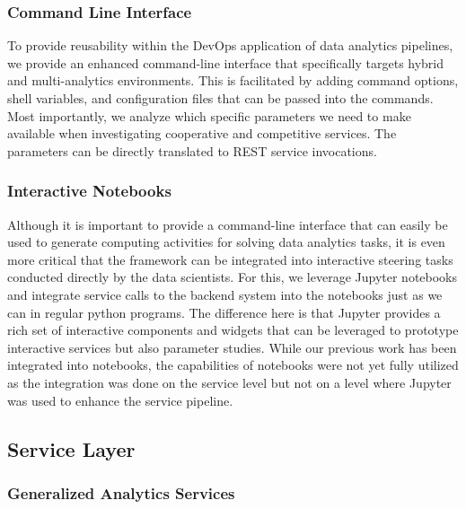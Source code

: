 \subsubsection{Command Line Interface}

To provide reusability within the DevOps application of data analytics
pipelines, we provide an enhanced command-line interface that
specifically targets hybrid and multi-analytics environments. This is
facilitated by adding command options, shell variables, and
configuration files that can be passed into the commands.
Most importantly, we analyze which specific parameters we
need to make available when investigating cooperative and competitive
services. The parameters can be directly translated to REST service invocations.

\subsubsection{Interactive Notebooks}

Although it is important to provide a command-line interface that can
easily be used to generate computing activities for solving data
analytics tasks, it is even more critical that the framework can be
integrated into interactive steering tasks conducted directly by the
data scientists. For this, we leverage Jupyter notebooks and integrate
service calls to the backend system into the notebooks just as we can
in regular python programs. The difference here is that Jupyter
provides a rich set of interactive components and widgets that can be
leveraged to prototype interactive services but also parameter
studies. While our
previous work has been integrated into notebooks, the capabilities of
notebooks were not yet fully utilized as the integration was done on
the service level but not on a level where Jupyter was used to enhance
the service pipeline. 

\subsection {Service Layer}

\subsubsection{Generalized Analytics Services}
\label{s:gas}

